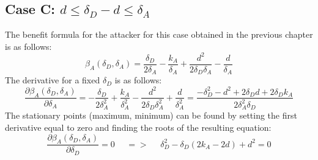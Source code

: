 %
%
%

\subsection*{Case C: $d \leq \delta_{D} -d \leq \delta_{A} $}

The benefit formula for the attacker for this case obtained in the previous chapter is as follows:
\begin{equation*}
\beta_{A}(\delta_{D},\delta_{A}) =\dfrac{\delta_{D}}{2\delta_{A}} - \dfrac{k_{A}}{\delta_{A}} + \dfrac{d^{2}}{2\delta_{D}\delta_{A}} - \dfrac{d}{\delta_{A}}
\end{equation*}
The derivative for a fixed $\delta_{D}$ is as follows:
\begin{equation*}
\dfrac{\partial \beta_{A}(\delta_{D},\delta_{A})}{\partial \delta_{A}} = -\dfrac{\delta_{D}}{2\delta_{A}^{2}} + \dfrac{k_{A}}{\delta_{A}^{2}} - \dfrac{d^{2}}{2\delta_{D}\delta_{A}^{2}} + \dfrac{d}{\delta_{A}^{2}} = \dfrac{-\delta_{D}^{2} - d^{2} + 2\delta_{D}d + 2\delta_{D}k_{A}}{2\delta_{A}^{2}\delta_{D}}
\end{equation*}
The stationary points (maximum, minimum) can be found by setting the first derivative equal to zero and finding the roots of the resulting equation:
\begin{equation*}
\frac{\partial \beta_{A}(\delta_{D},\delta_{A})}{\partial \delta_{D}} =0 ~~~~~~ =>~~~~~~  \delta_{D}^{2}-\delta_{D}(2k_{A}-2d) + d^{2}= 0
\end{equation*}

